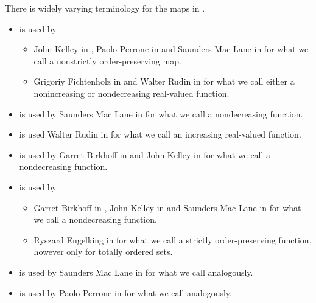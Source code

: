 \begin{remark}\label{rem:order_homomorphism_terminology}
  There is widely varying terminology for the maps in .

  \begin{itemize}
    \item {} is used by
    \begin{itemize}
      \item John Kelley in \cite[3]{Kelley1975}, Paolo Perrone in \cite[example 1.5.9]{Perrone2019} and Saunders Mac Lane in \cite[92]{MacLane1998} for what we call a nonstrictly order-preserving map.
      \item Grigoriy Fichtenholz in \cite[№47]{ФихтенгольцОсновыТом1} and Walter Rudin in \cite[def. 4.28]{Rudin1976Principles} for what we call either a nonincreasing or nondecreasing real-valued function.
    \end{itemize}

    \item {} is used by Saunders Mac Lane in \cite[175]{MacLane1998} for what we call a nondecreasing function.

    \item {} is used Walter Rudin in \cite[def. 4.28]{Rudin1976Principles} for what we call an increasing real-valued function.

    \item {} is used by Garret Birkhoff in \cite[3]{Birkhoff1948} and John Kelley in \cite[3]{Kelley1975} for what we call a nondecreasing function.

    \item {} is used by
    \begin{itemize}
       \item Garret Birkhoff in \cite[3]{Birkhoff1948}, John Kelley in \cite[3]{Kelley1975} and Saunders Mac Lane in \cite[95]{MacLane1998} for what we call a nondecreasing function.

       \item Ryszard Engelking in \cite[4]{Engelking1989} for what we call a strictly order-preserving function, however only for totally ordered sets.
    \end{itemize}

    \item {} is used by Saunders Mac Lane in \cite[95]{MacLane1998} for what we call analogously.

    \item {} is used by Paolo Perrone in \cite[example 1.5.9]{Perrone2019} for what we call analogously.


\end{itemize}
\end{remark}
